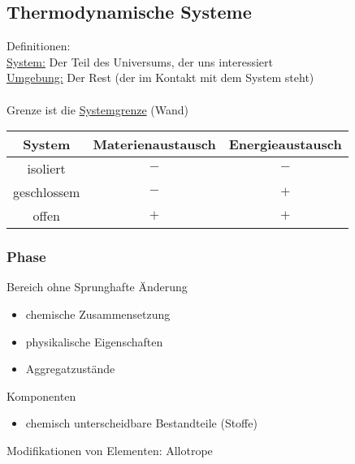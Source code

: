 \documentclass[a4paper]{article}
\begin{document}
\subsection{Thermodynamische Systeme}
Definitionen:\\
\underline{System:} \hspace*{1.55cm} Der Teil des Universums, der uns interessiert\\
\underline{Umgebung:} \hspace*{1cm} Der Rest \hspace*{0.5cm} (der im Kontakt mit dem System steht)\\
\\
Grenze ist die \underline{Systemgrenze} \hspace*{0.5cm} (Wand)
\begin{center}
    \begin{tabular}{c c c} 
     \hline
     System & Materienaustausch & Energieaustausch \\ 
     \hline
     isoliert & $-$ & $-$ \\ 
     geschlossem & $-$ & $+$ \\ 
     offen & $+$ & $+$\\
     \hline
    \end{tabular}
    \end{center}
\subsubsection{Phase}
Bereich ohne Sprunghafte Änderung
\begin{itemize}
    \item chemische Zusammensetzung
    \item physikalische Eigenschaften
    \item Aggregatzustände
\end{itemize}
Komponenten
\begin{itemize}
    \item chemisch unterscheidbare Bestandteile (Stoffe)
\end{itemize}
Modifikationen von Elementen: Allotrope
\end{document}
